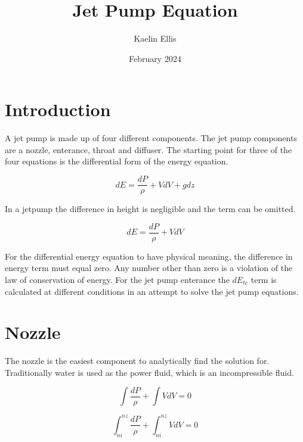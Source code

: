\documentclass{article}
\title{Jet Pump Equation}
\author{Kaelin Ellis}
\date{February 2024}
\begin{document}
\maketitle

\section{Introduction}

A jet pump is made up of four different components. The jet pump components are a nozzle, enterance, throat and diffuser. The starting point for three of the four equations is the differential form of the energy equation.

\begin{equation}
dE = \frac{dP}{\rho} + VdV + gdz
\end{equation}

In a jetpump the difference in height is negligible and the term can be omitted.

\begin{equation}
    dE = \frac{dP}{\rho} + VdV
\end{equation}

For the differential energy equation to have physical meaning, the difference in energy term must equal zero. Any number other than zero is a violation of the law of conservation of energy. For the jet pump enterance the $dE_{te}$ term is calculated at different conditions in an attempt to solve the jet pump equations.

\section{Nozzle}

The nozzle is the easiest component to analytically find the solution for. Traditionally water is used as the power fluid, which is an incompressible fluid.

\begin{equation}
\int{\frac{dP}{\rho}} + \int{VdV} = 0
\end{equation}

\begin{equation}
\int_{ni}^{nz} \frac{dP}{\rho} + \int_{ni}^{nz} VdV = 0
\end{equation}
\end{document}
